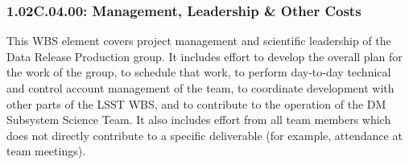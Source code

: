 \subsubsection*{1.02C.04.00: Management, Leadership \& Other Costs}

This WBS element covers project management and scientific leadership of the
Data Release Production group. It includes effort to develop the overall plan
for the work of the group, to schedule that work, to perform day-to-day
technical and control account management of the team, to coordinate
development with other parts of the LSST WBS, and to contribute to the
operation of the DM Subsystem Science Team.  It also includes effort from all
team members which does not directly contribute to a specific deliverable (for
example, attendance at team meetings).
